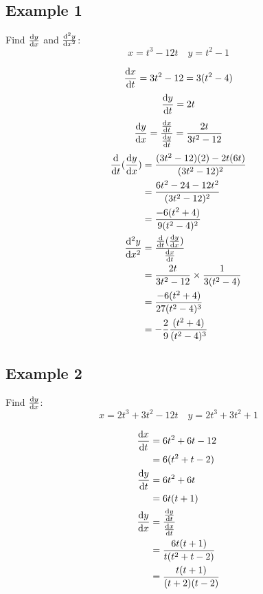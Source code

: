 \documentclass{math}
\begin{document}
\subsection*{Example 1}
Find \( \frac{\mathrm{d}{y}}{\mathrm{d}{x}} \) and \( \frac{\mathrm{d^2}{y}}{\mathrm{d}{x}^{2}} \):
\[ x = t^{3}-12t \quad y = t^{2}-1 \]
\begin{center}
\end{center}
\[ \frac{\mathrm{d}{x}}{\mathrm{d}{t}} = 3t^{2}-12 = 3(t^{2}-4) \]
\[ \frac{\mathrm{d}{y}}{\mathrm{d}{t}} = 2t \]
\[ \frac{\mathrm{d}{y}}{\mathrm{d}{x}} =
   \frac{\frac{\mathrm{d}{x}}{\mathrm{d}{t}}}{\frac{\mathrm{d}{y}}{\mathrm{d}{t}}} =
   \frac{2t}{3t^{2}-12} \]
\begin{align*}
  \frac{\mathrm{d}}{\mathrm{d}{t}}(\frac{\mathrm{d}{y}}{\mathrm{d}{x}}) &=
    \frac{(3t^{2}-12)(2)-2t(6t)}{(3t^{2}-12)^{2}} \\
  &= \frac{6t^{2}-24-12t^{2}}{(3t^{2}-12)^{2}} \\
  &= \frac{-6(t^{2}+4)}{9(t^{2}-4)^{2}} \\
  \frac{\mathrm{d^2}{y}}{\mathrm{d}{x}^{2}} &=
    \frac{\frac{\mathrm{d}}{\mathrm{d}{t}}(\frac{\mathrm{d}{y}}{\mathrm{d}{x}})}
      {\frac{\mathrm{d}{x}}{\mathrm{d}{t}}} \\
  &= \frac{2t}{3t^{2}-12}\times\frac{1}{3(t^{2}-4)} \\
  &= \frac{-6(t^{2}+4)}{27(t^{2}-4)^{3}} \\
  &= -\frac{2}{9}\frac{(t^{2}+4)}{(t^{2}-4)^{3}}
\end{align*}

\subsection*{Example 2}
Find \( \frac{\mathrm{d}{y}}{\mathrm{d}{x}} \):
\[ x = 2t^{3}+3t^{2}-12t \quad y = 2t^{3}+3t^{2}+1 \]
\begin{center}
\end{center}
\begin{align*}
  \frac{\mathrm{d}{x}}{\mathrm{d}{t}} &= 6t^{2}+6t-12 \\
  &= 6(t^{2}+t-2) \\
  \frac{\mathrm{d}{y}}{\mathrm{d}{t}} &= 6t^{2}+6t \\
  &= 6t(t+1) \\
  \frac{\mathrm{d}{y}}{\mathrm{d}{x}} &=
    \frac{\frac{\mathrm{d}{y}}{\mathrm{d}{t}}}{\frac{\mathrm{d}{x}}{\mathrm{d}{t}}} \\
  &= \frac{6t(t+1)}{t(t^{2}+t-2)} \\
  &= \frac{t(t+1)}{(t+2)(t-2)}
\end{align*}
\end{document}
